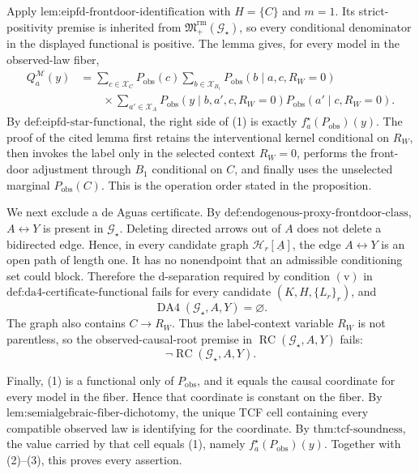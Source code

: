 Apply \(\text{lem:eipfd-frontdoor-identification}\) with \(H=\{C\}\) and \(m=1\).  Its strict-positivity premise is inherited from \(\mathfrak M_{+}^{\mathrm{rm}}(\mathcal G_\star)\), so every conditional denominator in the displayed functional is positive.  The lemma gives, for every model in the observed-law fiber,
\[
\begin{aligned}
Q_a^{\mathcal M}(y)
&=\sum_{c\in\mathcal X_C}P_{\mathrm{obs}}(c)
\sum_{b\in\mathcal X_{B_1}}P_{\mathrm{obs}}(b\mid a,c,R_W=0)\\
&\qquad\times\sum_{a'\in\mathcal X_A}
P_{\mathrm{obs}}(y\mid b,a',c,R_W=0)
P_{\mathrm{obs}}(a'\mid c,R_W=0).
\end{aligned}
\tag{1}
\]
By \(\text{def:eipfd-star-functional}\), the right side of (1) is exactly \(f_a^\star(P_{\mathrm{obs}})(y)\).  The proof of the cited lemma first retains the interventional kernel conditional on \(R_W\), then invokes the label only in the selected context \(R_W=0\), performs the front-door adjustment through \(B_1\) conditional on \(C\), and finally uses the unselected marginal \(P_{\mathrm{obs}}(C)\).  This is the operation order stated in the proposition.

We next exclude a de Aguas certificate.  By \(\text{def:endogenous-proxy-frontdoor-class}\), \(A\leftrightarrow Y\) is present in \(\mathcal G_\star\).  Deleting directed arrows out of \(A\) does not delete a bidirected edge.  Hence, in every candidate graph \(\mathcal H_r[\underline A]\), the edge \(A\leftrightarrow Y\) is an open path of length one.  It has no nonendpoint that an admissible conditioning set could block.  Therefore the d-separation required by condition \(\mathrm{(v)}\) in \(\text{def:da4-certificate-functional}\) fails for every candidate \((K,H,\{L_r\}_r)\), and
\[
\operatorname{DA4}(\mathcal G_\star,A,Y)=\varnothing.
\tag{2}
\]
The graph also contains \(C\to R_W\).  Thus the label-context variable \(R_W\) is not parentless, so the observed-causal-root premise in \(\operatorname{RC}(\mathcal G_\star,A,Y)\) fails:
\[
\neg\operatorname{RC}(\mathcal G_\star,A,Y).
\tag{3}
\]

Finally, (1) is a functional only of \(P_{\mathrm{obs}}\), and it equals the causal coordinate for every model in the fiber.  Hence that coordinate is constant on the fiber.  By \(\text{lem:semialgebraic-fiber-dichotomy}\), the unique TCF cell containing every compatible observed law is identifying for the coordinate.  By \(\text{thm:tcf-soundness}\), the value carried by that cell equals (1), namely \(f_a^\star(P_{\mathrm{obs}})(y)\).  Together with (2)--(3), this proves every assertion.